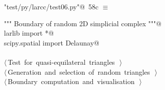 \documentclass[11pt,oneside]{article}    %
\begin{document}
\begin{flushleft} \small
\begin{minipage}{\linewidth} \label{scrap112}
\protect{}\verb@"test/py/larcc/test06.py"@\nobreak\ {\footnotesize 58c }$\equiv$
\vspace{-1ex}
\begin{list}{}{} \item
\mbox{}\verb@""" Boundary of random 2D simplicial complex """@\\
\mbox{}\verb@from larlib import *@\\
\mbox{}\verb@from scipy.spatial import Delaunay@\\
\mbox{}\verb@@\\
\mbox{}\verb@@\hbox{$\langle\,$Test for quasi-equilateral triangles\nobreak\ {\footnotesize {}}$\,\rangle$}\verb@@\\
\mbox{}\verb@@\hbox{$\langle\,$Generation and selection of random triangles\nobreak\ {\footnotesize {}}$\,\rangle$}\verb@@\\
\mbox{}\verb@@\hbox{$\langle\,$Boundary computation and visualisation\nobreak\ {\footnotesize {}}$\,\rangle$}\verb@@\\
\mbox{}\verb@@{\NWsep}
\end{list}
\vspace{-2ex}
\end{minipage}\\[4ex]
\end{flushleft}
\end{document}
